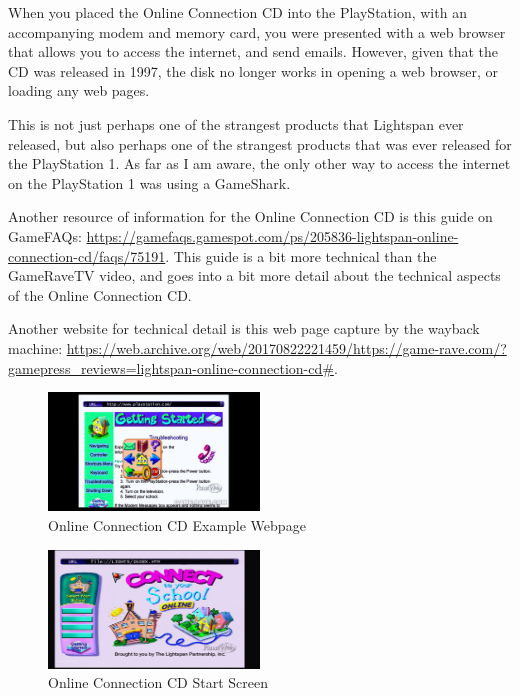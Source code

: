 When you placed the Online Connection CD into the PlayStation, with an accompanying modem and memory card, you were presented with a web browser that allows you to access the internet, and send emails.
However, given that the CD was released in 1997, the disk no longer works in opening a web browser, or loading any web pages.

This is not just perhaps one of the strangest products that Lightspan ever released, but also perhaps one of the strangest products that was ever released for the PlayStation 1.
As far as I am aware, the only other way to access the internet on the PlayStation 1 was using a GameShark.

Another resource of information for the Online Connection CD is this guide on GameFAQs: \url{https://gamefaqs.gamespot.com/ps/205836-lightspan-online-connection-cd/faqs/75191}.
This guide is a bit more technical than the GameRaveTV video, and goes into a bit more detail about the technical aspects of the Online Connection CD.

Another website for technical detail is this web page capture by the wayback machine: \url{https://web.archive.org/web/20170822221459/https://game-rave.com/?gamepress_reviews=lightspan-online-connection-cd#}.

\begin{figure}[H]
    \centering
    \includegraphics[width=0.5\textwidth]{./Games/OnlineConnectionCD/Images/OnlineConnectionsCDExampleWebpage.jpg}
    \caption{Online Connection CD Example Webpage}
\end{figure}

\begin{figure}[H]
    \centering
    \includegraphics[width=0.5\textwidth]{./Games/OnlineConnectionCD/Images/OnlineConnectionsCDStartScreen.jpg}
    \caption{Online Connection CD Start Screen}
\end{figure}